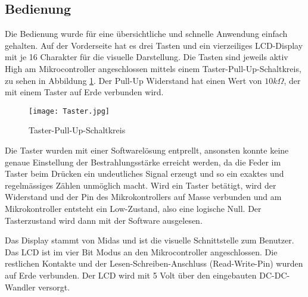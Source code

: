 \subsection{Bedienung}
Die Bedienung wurde für eine übersichtliche und schnelle Anwendung einfach gehalten. Auf der Vorderseite hat es drei Tasten und ein vierzeiliges LCD-Display mit je 16 Charakter für die visuelle Darstellung. Die Tasten sind jeweils aktiv High am Mikrocontroller angeschlossen mittels einem Taster-Pull-Up-Schaltkreis, zu sehen in Abbildung \ref{fig:SwitchPullUp_Software}. Der Pull-Up Widerstand hat einen Wert von $10k\Omega$, der mit einem Taster auf Erde verbunden wird.

\begin{figure}[h]
	\centering
		\texttt{[image: Taster.jpg]}
	\caption{Taster-Pull-Up-Schaltkreis}
	\label{fig:SwitchPullUp_Software}
\end{figure}

Die Taster wurden mit einer Softwarelösung entprellt, ansonsten konnte keine genaue Einstellung der Bestrahlungsstärke erreicht werden, da die Feder im Taster beim Drücken ein undeutliches Signal erzeugt und so ein exaktes und regelmässiges Zählen unmöglich macht. Wird ein Taster betätigt, wird der Widerstand und der Pin des Mikrokontrollers auf Masse verbunden und am Mikrokontroller entsteht ein Low-Zustand, also eine logische Null. Der Tasterzustand wird dann mit der Software ausgelesen.

Das Display stammt von Midas und ist die visuelle Schnittstelle zum Benutzer. Das LCD ist im vier Bit Modus an den Mikrocontroller angeschlossen. Die restlichen Kontakte und der Lesen-Schreiben-Anschluss (Read-Write-Pin) wurden auf Erde verbunden. Der LCD wird mit 5 Volt über den eingebauten DC-DC-Wandler versorgt.